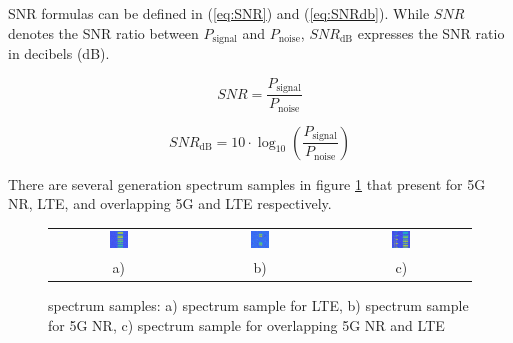 \documentclass[journal]{IEEEtran} %
\begin{document}
\indent SNR formulas can be defined in (\ref{eq:SNR}) and (\ref{eq:SNRdb}). While \(SNR\) denotes the SNR ratio between \(P_{\text{signal}}\) and \(P_{\text{noise}}\), \(SNR_{\text{dB}}\) expresses the SNR ratio in decibels (dB).

\begin{equation}
    SNR = \frac{P_{\text{signal}}}{P_{\text{noise}}}    
    \label{eq:SNR}
\end{equation}

\begin{equation}
    SNR_{\text{dB}} = 10 \cdot \log_{10} \left( \frac{P_{\text{signal}}}{P_{\text{noise}}} \right)
    \label{eq:SNRdb}
\end{equation}

\indent There are several generation spectrum samples in figure \ref{fig2} that present for 5G NR, LTE, and overlapping 5G and LTE respectively.

\begin{figure}[h]
    \centering
    \footnotesize
    \begin{tabular}{ccc}
        \includegraphics[width=0.14\textwidth]{img/LTE_frame_0.png} & \includegraphics[width=0.14\textwidth]{img/NR_frame_1506.png} &
        \includegraphics[width=0.14\textwidth]{img/LTE_NR_frame_0.png} & \\
        a) & b) & c)
    \end{tabular}
    \caption{spectrum samples: a) spectrum sample for LTE, b) spectrum sample for 5G NR, c) spectrum sample for overlapping 5G NR and LTE}
    \label{fig2}
\end{figure}
\end{document}
